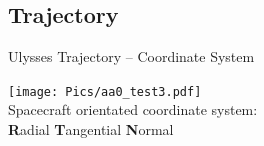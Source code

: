\documentclass{beamer}
\begin{document}
\subsection{Trajectory}
\begin{frame}{Ulysses Trajectory -- Coordinate System}
	\begin{center}
		\texttt{[image: Pics/aa0\_test3.pdf]} \\
		\vspace{0.8cm}
			Spacecraft orientated coordinate system:\\
		\textbf{R}adial \textbf{T}angential \textbf{N}ormal
		\end{center}
\end{frame}
\end{document}
